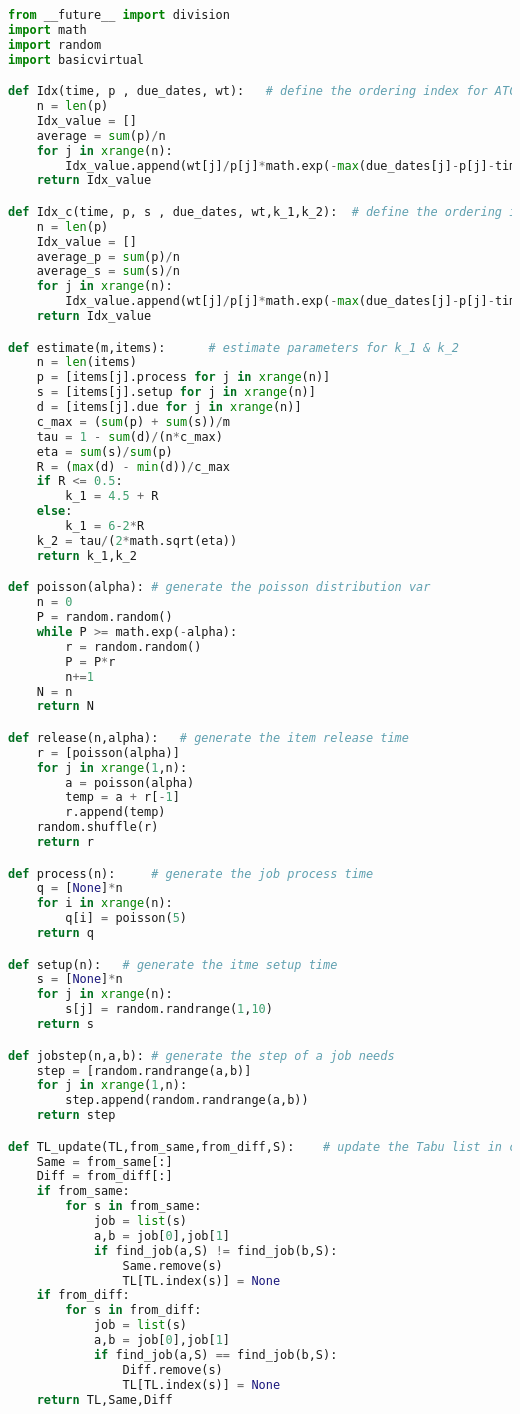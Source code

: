 \begin{lstlisting}[language = Python]
from __future__ import division
import math
import random
import basicvirtual

def Idx(time, p , due_dates, wt):	# define the ordering index for ATC rule
	n = len(p)
	Idx_value = []
	average = sum(p)/n
	for j in xrange(n):
		Idx_value.append(wt[j]/p[j]*math.exp(-max(due_dates[j]-p[j]-time,0)/2/average))
	return Idx_value

def Idx_c(time, p, s , due_dates, wt,k_1,k_2):	# define the ordering index for ATCS rule
	n = len(p)
	Idx_value = []
	average_p = sum(p)/n
	average_s = sum(s)/n
	for j in xrange(n):
		Idx_value.append(wt[j]/p[j]*math.exp(-max(due_dates[j]-p[j]-time,0)/k_1/average_p - s[j]/k_2/average_s))
	return Idx_value

def estimate(m,items):		# estimate parameters for k_1 & k_2
	n = len(items)
	p = [items[j].process for j in xrange(n)]
	s = [items[j].setup for j in xrange(n)]
	d = [items[j].due for j in xrange(n)]
	c_max = (sum(p) + sum(s))/m
	tau = 1 - sum(d)/(n*c_max)
	eta = sum(s)/sum(p)
	R = (max(d) - min(d))/c_max
	if R <= 0.5:
		k_1 = 4.5 + R
	else:
		k_1 = 6-2*R
	k_2 = tau/(2*math.sqrt(eta))
	return k_1,k_2

def poisson(alpha):	# generate the poisson distribution var
	n = 0
	P = random.random()
	while P >= math.exp(-alpha):
		r = random.random()
		P = P*r
		n+=1
	N = n
	return N

def release(n,alpha):	# generate the item release time
	r = [poisson(alpha)]
	for j in xrange(1,n):
		a = poisson(alpha)
		temp = a + r[-1]
		r.append(temp)
	random.shuffle(r)
	return r

def process(n):		# generate the job process time
	q = [None]*n
	for i in xrange(n):
		q[i] = poisson(5)
	return q

def setup(n):	# generate the itme setup time
	s = [None]*n
	for j in xrange(n):
		s[j] = random.randrange(1,10)
	return s

def jobstep(n,a,b):	# generate the step of a job needs
	step = [random.randrange(a,b)]
	for j in xrange(1,n):
		step.append(random.randrange(a,b))
	return step

def TL_update(TL,from_same,from_diff,S):	# update the Tabu list in case of over-tabu
	Same = from_same[:]
	Diff = from_diff[:]
	if from_same:
		for s in from_same:
			job = list(s)
			a,b = job[0],job[1]
			if find_job(a,S) != find_job(b,S):
				Same.remove(s)
				TL[TL.index(s)] = None
	if from_diff:
		for s in from_diff:
			job = list(s)
			a,b = job[0],job[1]
			if find_job(a,S) == find_job(b,S):
				Diff.remove(s)
				TL[TL.index(s)] = None
	return TL,Same,Diff


\end{lstlisting}
